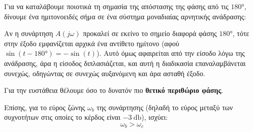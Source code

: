 \documentclass[11pt,a4paper,notitlepage,fleqn]{article}
\begin{document}
Για να καταλάβουμε ποιοτικά τη σημασία της απόστασης της φάσης από τις \( \ang{180} \),
δίνουμε ένα ημιτονοειδές σήμα σε ένα σύστημα μοναδιαίας αρνητικής ανάδρασης:


Αν η συνάρτηση \( A(j\omega) \) προκαλεί σε εκείνο το σημείο διαφορά φάσης \( \ang{180} \),
τότε στην έξοδο εμφανίζεται αρχικά ένα αντίθετο ημίτονο (αφού \( \sin(t-\ang{180})=-\sin(t)
 \)). Αυτό όμως αφαιρείται από την είσοδο λόγω της ανάδρασης, άρα η είσοδος διπλασιάζεται,
και αυτή η διαδικασία επαναλαμβάνεται συνεχώς, οδηγώντας σε συνεχώς αυξανόμενη και άρα
ασταθή έξοδο.

Για την ευστάθεια θέλουμε όσο το δυνατόν πιο \textbf{θετικό περιθώριο φάσης}.

Επίσης, για το εύρος ζώνης \( \omega_b \) της συνάρτησης (δηλαδή το εύρος μεταξύ των
συχνοτήτων στις οποίες το κέρδος είναι \( \SI{-3}{\decibel} \)), ισχύει:
\[
\boxed{\omega_b > \omega_c}
\]
\end{document}
